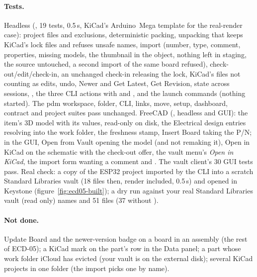 \paragraph{Tests.} Headless (, 19 tests, 0.5\,s, KiCad's
Arduino~Mega template for the real-render case): project files and exclusions, deterministic packing, unpacking that
keeps KiCad's lock files and refuses unsafe names, import (number, type, comment, properties, missing models, the
thumbnail in the object, nothing left in staging, the source untouched, a second import of the same board refused),
check-out/edit/check-in, an unchanged check-in releasing the lock, KiCad's files not counting as edits, undo,
Newer and Get Latest, Get Revision, state across sessions, , the three CLI actions with
 and , and the launch commands (nothing started). The pdm workspace, folder, CLI,
links, move, setup, dashboard, contract and project suites pass unchanged. FreeCAD
(, headless and GUI): the item's 3D model with its values, read-only on disk,
the Electrical design entries resolving into the work folder, the freshness stamp, Insert Board taking the P/N; in
the GUI, Open from Vault opening the model (and not remaking it), Open in KiCad on the schematic with the check-out
offer, the vault menu's \emph{Open in KiCad}, the import form wanting a comment and . The
vault client's 30 GUI tests pass. Real check: a copy of the ESP32 project imported by the CLI into a scratch Standard
Libraries vault (18 files then, render included, 0.5\,s) and opened in Keystone (figure~\ref{fig:ecd05-built}); a
dry run against your real Standard Libraries vault (read only) names  and 51 files (37 without
).

\paragraph{Not done.} Update Board and the newer-version badge on a board in an assembly (the rest of ECD-05); a
KiCad mark on the part's row in the Data panel; a part whose work folder iCloud has evicted (your vault is on the
external disk); several KiCad projects in one folder (the import picks one by name).

